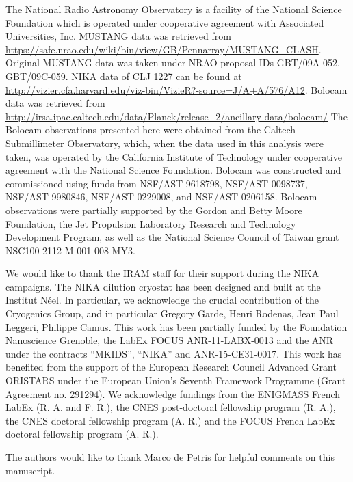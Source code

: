 \documentclass[twocolumn,traditabstract]{aa}
\begin{document}
The National Radio Astronomy Observatory is a facility of the National Science Foundation which is operated
under cooperative agreement with Associated Universities, Inc. MUSTANG data was retrieved from
\url{https://safe.nrao.edu/wiki/bin/view/GB/Pennarray/MUSTANG_CLASH}. Original MUSTANG data was
taken under NRAO proposal IDs GBT/09A-052, GBT/09C-059. NIKA data of CLJ 1227 can be found at
\url{http://vizier.cfa.harvard.edu/viz-bin/VizieR?-source=J/A+A/576/A12}. Bolocam data was retrieved from
\url{http://irsa.ipac.caltech.edu/data/Planck/release\_2/ancillary-data/bolocam/}
The Bolocam observations presented here were obtained from the Caltech Submillimeter Observatory, which,
when the data used in this analysis were taken, was operated by the California Institute of Technology under
cooperative agreement with the National Science Foundation. Bolocam was constructed and commissioned using funds
from NSF/AST-9618798, NSF/AST-0098737, NSF/AST-9980846, NSF/AST-0229008, and NSF/AST-0206158. Bolocam observations
were partially supported by the Gordon and Betty Moore Foundation, the Jet Propulsion Laboratory Research and
Technology Development Program, as well as the National Science Council of Taiwan grant NSC100-2112-M-001-008-MY3.

We would like to thank the IRAM staff for their support during the NIKA campaigns. 
The NIKA dilution cryostat has been designed and built at the Institut N\'eel. 
In particular, we acknowledge the crucial contribution of the Cryogenics Group, and 
in particular Gregory Garde, Henri Rodenas, Jean Paul Leggeri, Philippe Camus. 
This work has been partially funded by the Foundation Nanoscience Grenoble, the LabEx FOCUS ANR-11-LABX-0013 and 
the ANR under the contracts ``MKIDS'', ``NIKA'' and ANR-15-CE31-0017. 
This work has benefited from the support of the European Research Council Advanced Grant ORISTARS 
under the European Union's Seventh Framework Programme (Grant Agreement no. 291294).
We acknowledge fundings from the ENIGMASS French LabEx (R. A. and F. R.), 
the CNES post-doctoral fellowship program (R. A.), the CNES doctoral fellowship program (A. R.) and 
the FOCUS French LabEx doctoral fellowship program (A. R.).

The authors would like to thank Marco de Petris for helpful comments on this manuscript.

\end{document}
